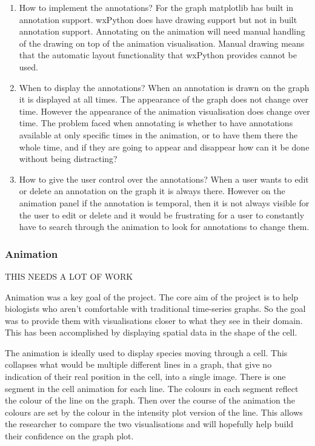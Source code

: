 \begin{enumerate}
\item How to implement the annotations?  For the graph matplotlib has built in annotation support.  wxPython does have drawing support but not in built annotation support.  Annotating on the animation will need manual handling of the drawing on top of the animation visualisation.  Manual drawing means that the automatic layout functionality that wxPython provides cannot be used.
\item When to display the annotations?  When an annotation is drawn on the graph it is displayed at all times.  The appearance of the graph does not change over time.  However the appearance of the animation visualisation does change over time.  The problem faced when annotating is whether to have annotations available at only specific times in the animation, or to have them there the whole time, and if they are going to appear and disappear how can it be done without being distracting?
\item How to give the user control over the annotations? When a user wants to edit or delete an annotation on the graph it is always there.  However on the animation panel if the annotation is temporal, then it is not always visible for the user to edit or delete and it would be frustrating for a user to constantly have to search through the animation to look for annotations to change them.
\end{enumerate}

\subsubsection{Animation}

THIS NEEDS A LOT OF WORK

Animation was a key goal of the project.  The core aim of the project is to help biologists who aren't comfortable with traditional time-series graphs.  So the goal was to provide them with visualisations closer to what they see in their domain.  This has been accomplished by displaying spatial data in the shape of the cell.

The animation is ideally used to display species moving through a cell.  This collapses what would be multiple different lines in a graph, that give no indication of their real position in the cell, into a single image.  There is one segment in the cell animation for each line.  The colours in each segment reflect the colour of the line on the graph.  Then over the course of the animation the colours are set by the colour in the intensity plot version of the line.  This allows the researcher to compare the two visualisations and will hopefully help build their confidence on the graph plot.


